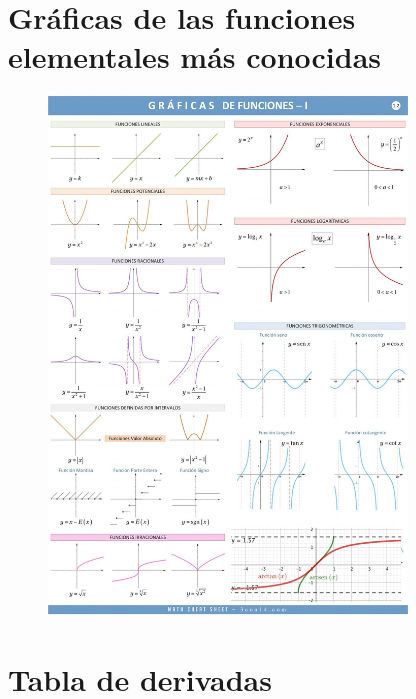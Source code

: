 \chapter{\small{Gráficas de las funciones elementales más conocidas}}
\vspace{-10mm}
\begin{figure}[H]
		\centering
		\includegraphics[width=0.85\textwidth]{imagenes/apendices/APENDICESIM09.png}
	\end{figure} 
	
	
	
\chapter{Tabla de derivadas}
	\label{app:tabla-derivadas}

